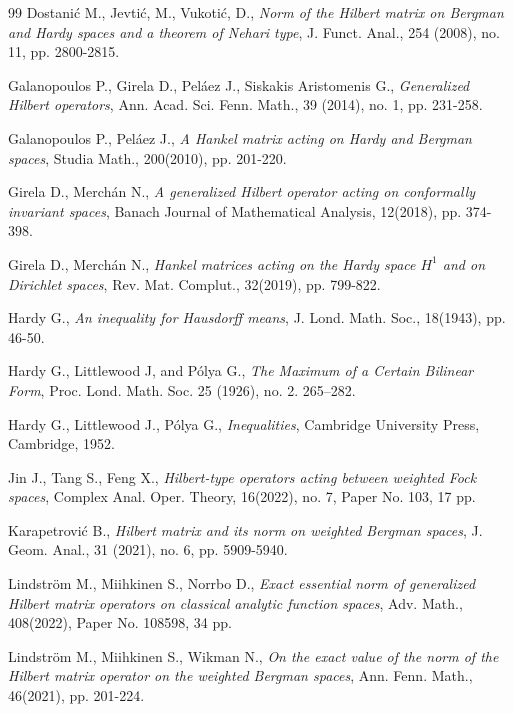 \documentclass[10pt]{amsart}
\theoremstyle{definition}
\theoremstyle{question}
\numberwithin{equation}{section}
\begin{document}
\begin{thebibliography}{99}
 Dostani\'{c} M., Jevti\'{c}, M., Vukoti\'{c}, D., {\em  Norm of the Hilbert matrix on Bergman and Hardy spaces and a theorem of Nehari type}, J. Funct. Anal., 254 (2008), no. 11, pp. 2800-2815.


Galanopoulos P.,  Girela D., Pel\'{a}ez  J.,  Siskakis  Aristomenis G., {\em Generalized Hilbert operators},  Ann. Acad. Sci. Fenn. Math., 39 (2014), no. 1, pp. 231-258.

Galanopoulos P.,  Pel\'{a}ez J.,  {\em A Hankel matrix acting on Hardy and Bergman spaces}, Studia Math., 200(2010), pp. 201-220.

Girela D., Merch\'{a}n N., {\em A generalized Hilbert operator acting on conformally invariant spaces}, Banach Journal of Mathematical Analysis, 12(2018), pp. 374-398.

Girela D.,  Merch\'{a}n N., {\em Hankel matrices acting on the Hardy space $H^1$ and on Dirichlet spaces}, Rev. Mat. Complut., 32(2019), pp. 799-822.

Hardy G., {\em An inequality for Hausdorff means}, J. Lond. Math. Soc., 18(1943), pp. 46-50.

Hardy G., Littlewood J, and P\'{o}lya G., {\em The Maximum of a Certain Bilinear Form}, Proc. Lond. Math. Soc. 25 (1926), no. 2. 265–282.

Hardy G.,  Littlewood J., P\'{o}lya G., {\em Inequalities}, Cambridge University Press, Cambridge, 1952.

Jin J., Tang S., Feng X., {\em Hilbert-type operators acting between weighted Fock spaces}, Complex Anal. Oper. Theory,  16(2022), no. 7, Paper No. 103, 17 pp.

 Karapetrovi\'{c} B., {\em Hilbert matrix and its norm on weighted Bergman spaces}, J. Geom. Anal.,  31 (2021), no. 6, pp. 5909-5940.

Lindstr\"om M., Miihkinen S., Norrbo D., {\em Exact essential norm of generalized Hilbert matrix operators on classical analytic function spaces}, Adv. Math., 408(2022), Paper No. 108598, 34 pp.

Lindstr\"om M., Miihkinen S., Wikman N., {\em On the exact value of the norm of the Hilbert matrix operator on the weighted Bergman spaces},  Ann. Fenn. Math., 46(2021), pp. 201-224. 




\end{thebibliography}
\end{document}
